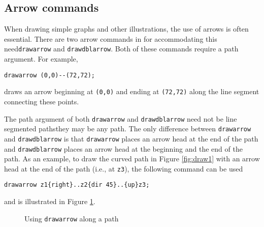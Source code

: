\subsection{Arrow commands}

When drawing simple graphs and other illustrations, the use of arrows is
often essential.  There are two arrow commands in \MP{} for
accommodating this need\Dash \texttt{drawarrow} and
\texttt{drawdblarrow}.  Both of these commands require a path argument.
For example,

\begin{center}
  \verb|drawarrow (0,0)--(72,72);|
\end{center}

draws an arrow beginning at \verb|(0,0)| and ending at \verb|(72,72)|
along the line segment connecting these points.

The path argument of both \texttt{drawarrow} and \texttt{drawdblarrow}
need not be line segmented paths\Dash they may be any \MP{} path.  The
only difference between \texttt{drawarrow} and \texttt{drawdblarrow} is
that \texttt{drawarrow} places an arrow head at the end of the path and
\texttt{drawdblarrow} places an arrow head at the beginning and the end
of the path.  As an example, to draw the curved path in Figure
\ref{fig:draw1} with an arrow head at the end of the path (i.e., at
\texttt{z3}), the following command can be used

\begin{center}
  \verb|drawarrow z1{right}..z2{dir 45}..{up}z3;|
\end{center}

and is illustrated in Figure \ref{fig:draw2}.

\begin{figure}[ht]
	\begin{center}
  \end{center}
	\caption{Using \texttt{drawarrow} along a path}
  \label{fig:draw2}
\end{figure}
